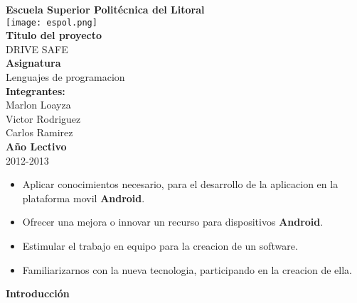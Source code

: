 \documentclass[a4paper]{article}						%
\begin{document}

	\begin{center}
		\vspace{1cm}
		\textbf{\huge{Escuela Superior Politécnica del Litoral}}\\
		\vspace{0.5cm}
		\texttt{[image: espol.png]} \\
		\vspace{1cm}
		\textbf{\large{Titulo del proyecto}}\\
		\vspace{0.5cm}
		\Large{DRIVE SAFE}\\
		\vspace{1cm}
		\textbf{Asignatura}\\
		\vspace{0.5cm}
		Lenguajes de programacion\\	
		\vspace{1cm}	
		\textbf{\large{Integrantes:}}\\
		\vspace{1cm}
		Marlon Loayza\\
		\vspace{0.3cm}
		Victor Rodriguez\\
		\vspace{0.3cm}
		Carlos Ramirez\\
		\vspace{1cm}
		\textbf{Año Lectivo}\\
		\vspace{0.5cm}
		2012-2013
		\end{center}
		\newpage
	
	\begin{itemize}
		\Large
		\item Aplicar conocimientos necesario, para el desarrollo de la aplicacion en la plataforma movil \textbf{Android}.
		\item Ofrecer una mejora o innovar un recurso para dispositivos \textbf{Android}.
		\item Estimular el trabajo en equipo para la creacion de un software.
		\item Familiarizarnos con la nueva tecnologia, participando en la creacion de ella.
	\end{itemize}
	\newpage
	{\parindent=0mm\bf{\Large{Introducción}}}\\
	\vspace{2cm}\\
		\fontsize{14}{0}\selectfont{Con  las nuevas reformas en el reglamento de tránsito y las nuevas forma 
			de sanción que ha implementado la comisión de transito nacional, han surgido muchas irregularidades e inconformidades
			por esta forma de multa por sensores de velocidad, no obstante sin quitarle merito a estas reformas por
			 el decremento de los accidentes de tránsito.}\\
	 \vspace{1cm}\\
		
\end{document}
